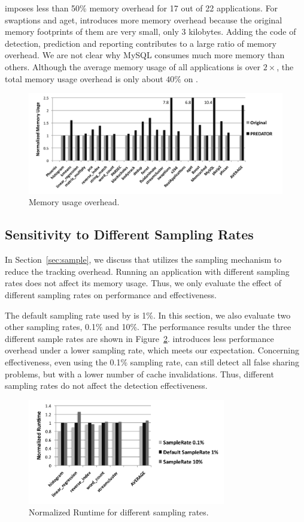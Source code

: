 \Predator{} imposes less than 50\% memory overhead for 17 out of 22 applications.  For swaptions and aget, \Predator{} introduces more memory overhead because the original memory footprints of them are very small, only $3$ kilobytes. Adding the code of detection, prediction and reporting contributes to a large ratio of memory overhead. We are not clear why MySQL consumes much more memory than others. Although the average memory usage of all applications is over $2\times$, the total memory usage overhead is only about $40\%$ on \Predator{}. 

\begin{figure}
\begin{center} 
\includegraphics[width=6.5in]{fig/memusage}
\end{center}
\caption{Memory usage overhead.}
\label{fig:memusage}
\end{figure}


\subsection{Sensitivity to Different Sampling Rates}
\label{sec:sensitivity}
In Section~\ref{sec:sample}, we discuss that \Predator{} utilizes the sampling mechanism to reduce the tracking overhead. Running an application with different sampling rates does not affect its memory usage. Thus, we only evaluate the effect of different sampling rates on performance and effectiveness. 

The default sampling rate used by \Predator{} is 1\%. In this section, we also evaluate two other sampling rates, 0.1\% and 10\%. The performance results under the three different sample rates are shown in Figure~\ref{fig:sample}. \Predator{} introduces less performance overhead under a lower sampling rate, which meets our expectation. Concerning effectiveness, even using the 0.1\% sampling rate, \Predator{} can still detect all false sharing problems, but with a lower number of cache invalidations. Thus, different sampling rates do not affect the detection effectiveness.
 
\begin{figure}
\begin{center} 
\includegraphics[width=3.4in]{fig/sample}
\end{center}
\caption{Normalized Runtime for different sampling rates.}
\label{fig:sample}
\end{figure}


